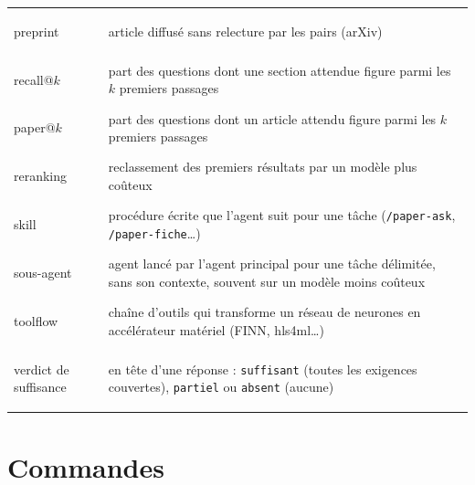 \documentclass[11pt,a4paper]{article}
\newcommand{\cmd}[1]{\texttt{#1}}
\begin{document}
\begin{center}
\begin{tabularx}{\linewidth}{@{}lL@{}}
\hypertarget{gl:preprint}{preprint} & article diffusé sans relecture par les pairs (arXiv) \\
\hypertarget{gl:recall}{recall@$k$} & part des questions dont une section attendue figure parmi les $k$ premiers passages \\
\hypertarget{gl:paperk}{paper@$k$} & part des questions dont un article attendu figure parmi les $k$ premiers passages \\
\hypertarget{gl:reranking}{reranking} & reclassement des premiers résultats par un modèle plus coûteux \\
\hypertarget{gl:skill}{skill} & procédure écrite que l'agent suit pour une tâche (\cmd{/paper-ask}, \cmd{/paper-fiche}\ldots) \\
\hypertarget{gl:sousagent}{sous-agent} & agent lancé par l'agent principal pour une tâche délimitée, sans son contexte, souvent sur un modèle moins coûteux \\
\hypertarget{gl:toolflow}{toolflow} & chaîne d'outils qui transforme un réseau de neurones en accélérateur matériel (FINN, hls4ml\ldots) \\
\hypertarget{gl:verdict}{verdict de suffisance} & en tête d'une réponse : \cmd{suffisant} (toutes les exigences couvertes), \cmd{partiel} ou \cmd{absent} (aucune) \\
\bottomrule
\end{tabularx}
\end{center}

\section{Commandes}
\end{document}
